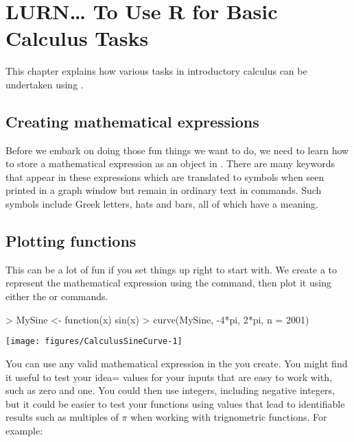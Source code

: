 

 
\chapter{LURN\ldots{} To Use R for Basic Calculus Tasks} 
\label{Calculus} 
 



 
This chapter explains how various tasks in introductory calculus can be undertaken using \R{}. 
 
 
\section{Creating mathematical expressions} 
 
Before we embark on doing those fun things we want to do, we need to learn how to store a mathematical expression as an object in \R{}. There are many keywords that appear in these expressions which are translated to symbols when seen printed in a graph window but remain in ordinary text in \R{} commands. Such symbols include Greek letters, hats and bars, all of which have a meaning. 
 
\section{Plotting functions} 
 
This can be a lot of fun if you set things up right to start with. We create a  to represent the mathematical expression using the  command, then plot it using either the  or  commands. 

\begin{Schunk}
\begin{Sinput}
> MySine <- function(x){ sin(x)} 
> curve(MySine, -4*pi, 2*pi, n = 2001) 
\end{Sinput}

\texttt{[image: figures/CalculusSineCurve-1]} \end{Schunk}

 
You can use any valid mathematical expression in the  you create. You might find it useful to test your idea= values for your inputs that are easy to work with, such as zero and one. You could then use integers, including negative integers, but  it could be easier to test your functions using values that lead to identifiable results such as multiples of $\pi$ when working with trignometric functions. For example: 

